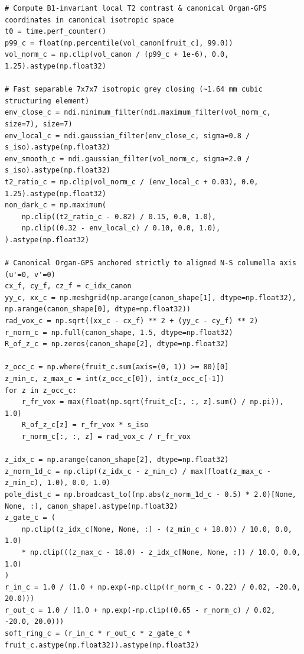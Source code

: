 \documentclass[10pt,a4paper]{article}
\renewcommand{\_}{\origunderscore\allowbreak}
\begin{document}
\begin{codebox}
\begin{lstlisting}[style=pybmed]
# Compute B1-invariant local T2 contrast & canonical Organ-GPS coordinates in canonical isotropic space
t0 = time.perf_counter()
p99_c = float(np.percentile(vol_canon[fruit_c], 99.0))
vol_norm_c = np.clip(vol_canon / (p99_c + 1e-6), 0.0, 1.25).astype(np.float32)

# Fast separable 7x7x7 isotropic grey closing (~1.64 mm cubic structuring element)
env_close_c = ndi.minimum_filter(ndi.maximum_filter(vol_norm_c, size=7), size=7)
env_local_c = ndi.gaussian_filter(env_close_c, sigma=0.8 / s_iso).astype(np.float32)
env_smooth_c = ndi.gaussian_filter(vol_norm_c, sigma=2.0 / s_iso).astype(np.float32)
t2_ratio_c = np.clip(vol_norm_c / (env_local_c + 0.03), 0.0, 1.25).astype(np.float32)
non_dark_c = np.maximum(
    np.clip((t2_ratio_c - 0.82) / 0.15, 0.0, 1.0),
    np.clip((0.32 - env_local_c) / 0.10, 0.0, 1.0),
).astype(np.float32)

# Canonical Organ-GPS anchored strictly to aligned N-S columella axis (u'=0, v'=0)
cx_f, cy_f, cz_f = c_idx_canon
yy_c, xx_c = np.meshgrid(np.arange(canon_shape[1], dtype=np.float32), np.arange(canon_shape[0], dtype=np.float32))
rad_vox_c = np.sqrt((xx_c - cx_f) ** 2 + (yy_c - cy_f) ** 2)
r_norm_c = np.full(canon_shape, 1.5, dtype=np.float32)
R_of_z_c = np.zeros(canon_shape[2], dtype=np.float32)

z_occ_c = np.where(fruit_c.sum(axis=(0, 1)) >= 80)[0]
z_min_c, z_max_c = int(z_occ_c[0]), int(z_occ_c[-1])
for z in z_occ_c:
    r_fr_vox = max(float(np.sqrt(fruit_c[:, :, z].sum() / np.pi)), 1.0)
    R_of_z_c[z] = r_fr_vox * s_iso
    r_norm_c[:, :, z] = rad_vox_c / r_fr_vox

z_idx_c = np.arange(canon_shape[2], dtype=np.float32)
z_norm_1d_c = np.clip((z_idx_c - z_min_c) / max(float(z_max_c - z_min_c), 1.0), 0.0, 1.0)
pole_dist_c = np.broadcast_to((np.abs(z_norm_1d_c - 0.5) * 2.0)[None, None, :], canon_shape).astype(np.float32)
z_gate_c = (
    np.clip((z_idx_c[None, None, :] - (z_min_c + 18.0)) / 10.0, 0.0, 1.0)
    * np.clip(((z_max_c - 18.0) - z_idx_c[None, None, :]) / 10.0, 0.0, 1.0)
)
r_in_c = 1.0 / (1.0 + np.exp(-np.clip((r_norm_c - 0.22) / 0.02, -20.0, 20.0)))
r_out_c = 1.0 / (1.0 + np.exp(-np.clip((0.65 - r_norm_c) / 0.02, -20.0, 20.0)))
soft_ring_c = (r_in_c * r_out_c * z_gate_c * fruit_c.astype(np.float32)).astype(np.float32)



\end{lstlisting}
\end{codebox}
\end{document}

